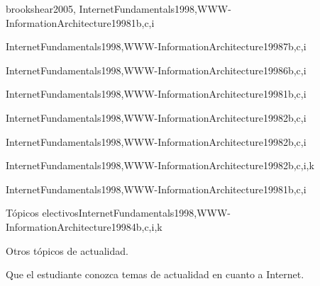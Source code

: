 \begin{syllabus}
\begin{unit}{\SEToolsAndEnvironmentsDef}{brookshear2005, InternetFundamentals1998,WWW-InformationArchitecture1998}{1}{b,c,i}
   \SEToolsAndEnvironmentsAllTopics
   \SEToolsAndEnvironmentsAllObjectives
\end{unit}

\begin{unit}{\NCWebOrganizationDef}{InternetFundamentals1998,WWW-InformationArchitecture1998}{7}{b,c,i}
   \NCWebOrganizationAllTopics
   \NCWebOrganizationAllObjectives
\end{unit}

\begin{unit}{\NCNetworkedApplicationsDef}{InternetFundamentals1998,WWW-InformationArchitecture1998}{6}{b,c,i}
   \NCNetworkedApplicationsAllTopics
   \NCNetworkedApplicationsAllObjectives
\end{unit}

\begin{unit}{\HCGUIDesignDef}{InternetFundamentals1998,WWW-InformationArchitecture1998}{1}{b,c,i}
   \HCGUIDesignAllTopics
   \HCGUIDesignAllObjectives
\end{unit}

\begin{unit}{\NCMultimediaTechnologiesDef}{InternetFundamentals1998,WWW-InformationArchitecture1998}{2}{b,c,i}
   \NCMultimediaTechnologiesAllTopics
   \NCMultimediaTechnologiesAllObjectives
\end{unit}

\begin{unit}{\HCMultimediaAndMultimodalSystemsDef}{InternetFundamentals1998,WWW-InformationArchitecture1998}{2}{b,c,i}
   \HCMultimediaAndMultimodalSystemsAllTopics
   \HCMultimediaAndMultimodalSystemsAllObjectives
\end{unit}

\begin{unit}{\SESoftwareValidationDef}{InternetFundamentals1998,WWW-InformationArchitecture1998}{2}{b,c,i,k}
   \SESoftwareValidationAllTopics
   \SESoftwareValidationAllObjectives
\end{unit}

\begin{unit}{\SPPrivateAndCivilLibertiesDef}{InternetFundamentals1998,WWW-InformationArchitecture1998}{1}{b,c,i}
   \SPPrivateAndCivilLibertiesAllTopics
   \SPPrivateAndCivilLibertiesAllObjectives
\end{unit}

\begin{unit}{Tópicos electivos}{InternetFundamentals1998,WWW-InformationArchitecture1998}{4}{b,c,i,k}
\begin{topics}
      \item Otros tópicos de actualidad.
   \end{topics}
   \begin{unitgoals}
      \item Que el estudiante conozca temas de actualidad en cuanto a Internet.
   \end{unitgoals}
\end{unit}




\end{syllabus}
